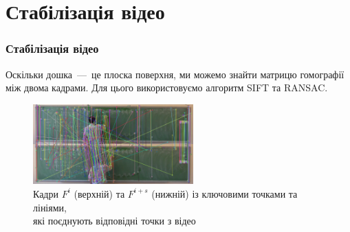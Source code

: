 \section{Стабілізація відео}
\begin{frame}
  \frametitle{Стабілізація відео}

  Оскільки дошка~---~це плоска поверхня, ми можемо знайти матрицю гомографії між двома кадрами.
  Для цього використовуємо алгоритм SIFT та RANSAC.
  \begin{figure}[H]
    \centering
    \includegraphics[width=0.55\textwidth]{images/matches_img}
    \caption{Кадри $F^i$ (верхній) та $F^{i+s}$ (нижній) із ключовими точками та лініями, \\
      які поєднують відповідні точки з відео
    }
  \end{figure}

\end{frame}
